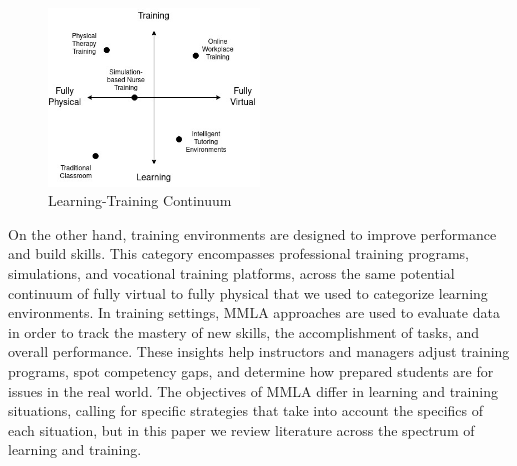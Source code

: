 \documentclass[manuscript,screen,review]{acmart}
\begin{document}
\begin{figure}
    \begin{center}
    \includegraphics[width=0.5\textwidth]{img/LearningTrainingContinuum.jpg}
    \end{center}
    \caption{Learning-Training Continuum}
    \label{fig:ltcontinuum}
\end{figure}


On the other hand, training environments are designed to improve performance and build skills. This category encompasses professional training programs, simulations, and vocational training platforms, across the same potential continuum of fully virtual to fully physical that we used to categorize learning environments. In training settings, MMLA approaches are used to evaluate data in order to track the mastery of new skills, the accomplishment of tasks, and overall performance. These insights help instructors and managers adjust training programs, spot competency gaps, and determine how prepared students are for issues in the real world. The objectives of MMLA differ in learning and training situations, calling for specific strategies that take into account the specifics of each situation, but in this paper we review literature across the spectrum of learning and training.
\end{document}
